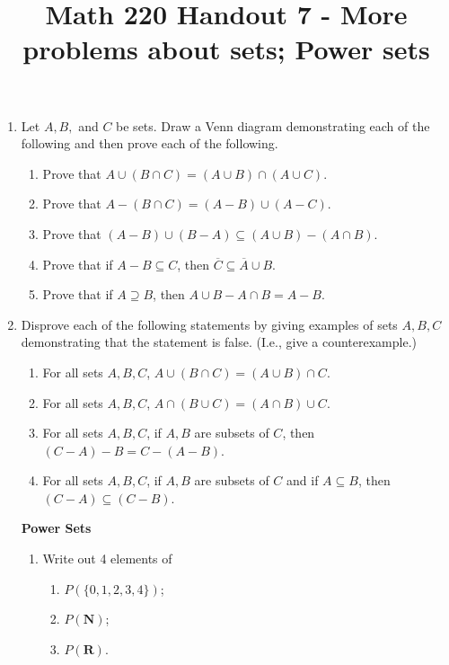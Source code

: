 \documentclass[12pt, reqno]{amsart}
\begin{document}
\title[Math 220 Handout 7 - More problems about sets; Power sets]{Math 220 Handout 7 - More problems about sets; Power sets}\maketitle


\begin{enumerate}
\item Let $A,B,$ and $C$ be sets. Draw a Venn diagram demonstrating each of the following and then prove each of the following.



\begin{enumerate}
\item Prove that $A \cup (B \cap C) = (A\cup B) \cap (A \cup C)$.
\item Prove that $A - (B \cap C) = (A - B) \cup (A - C)$.
\item Prove that $(A - B) \cup (B-A) \subseteq (A \cup B) - (A \cap B)$.
\item Prove that if $A - B \subseteq C$, then $ \overline{C} \subseteq \overline{A} \cup B$.
\item Prove that if $A \supseteq B$, then $A\cup B - A \cap B = A - B$.
\end{enumerate}
\vspace{1cm}

\item Disprove each of the following statements by giving examples of sets
$A,B,C$ demonstrating that the statement is false. (I.e., give a counterexample.)
\begin{enumerate}
\item For all sets $A,B,C$, $A \cup (B \cap C) = (A\cup B) \cap C$.
\item For all sets $A,B,C$, $A \cap (B \cup C) = (A\cap B) \cup C$.
\item For all sets $A,B,C$, if $A,B$ are subsets of $C$, then $(C-A) - B = C-(A-B)$.
\item For all sets $A,B,C$, if $A,B$ are subsets of $C$ and if $A \subseteq B$, then $(C-A) \subseteq (C- B)$.
\end{enumerate}

\newpage
\textbf{Power Sets}\\

\begin{enumerate}
\item Write out 4 elements of
 \begin{enumerate}
 \item $P(\{0,1,2,3,4\})$;
 \item $P(\mathbf{N})$;
 \item $P(\mathbf{R})$.\\
 \end{enumerate}
 \vspace{5cm}


\end{enumerate}
\end{enumerate}
\end{document}
